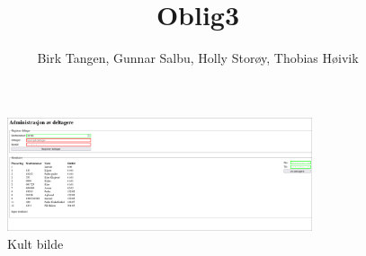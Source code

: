 
\usepackage{graphicx}   
\usepackage{float}     

\title{\huge{Oblig3}}
\author{\LARGE{Birk Tangen, Gunnar Salbu, Holly Storøy, Thobias Høivik}}
\date{}


\maketitle

\newpage
\tableofcontents

\newpage
\begin{figure}[H]   
    \centering
    \includegraphics[width=0.8\textwidth]{./Nettside.png}
    \caption{Kult bilde}
\end{figure}




